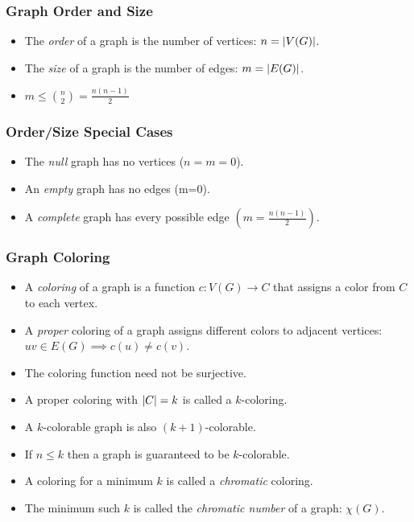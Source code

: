 \documentclass{beamer}
\newcommand{\X}{\chi}
\DeclarePairedDelimiter{\abs}{\lvert}{\rvert}
\begin{document}
\begin{frame}
  \frametitle{Graph Order and Size}
  \begin{itemize}
  \item The \emph{order} of a graph is the number of vertices: \(n=\abs{V(G)}\).
  \item The \emph{size} of a graph is the number of edges: \(m=\abs{E(G)}\).
  \item \(\displaystyle m\le\binom{n}{2}=\frac{n(n-1)}{2}\)
  \end{itemize}
\end{frame}

\begin{frame}
  \frametitle{Order/Size Special Cases}
  \begin{itemize}
  \item The \emph{null} graph has no vertices (\(n=m=0\)).
  \item An \emph{empty} graph has no edges (m=0).
  \item A \emph{complete} graph has every possible edge \(\displaystyle\left(m=\frac{n(n-1)}{2}\right)\).
  \end{itemize}
\end{frame}

\begin{frame}
  \frametitle{Graph Coloring}
  \begin{itemize}
  \item A \emph{coloring} of a graph is a function \(c:V(G)\to C\) that assigns a color from \(C\) to each vertex.
  \item A \emph{proper} coloring of a graph assigns different colors to adjacent vertices:
    \(uv\in E(G)\implies c(u)\ne c(v)\).
  \item The coloring function need not be surjective.
  \item A proper coloring with \(\abs{C}=k\) is called a \(k\)-coloring.
  \item A \(k\)-colorable graph is also \((k+1)\)-colorable.
  \item If \(n\le k\) then a graph is guaranteed to be \(k\)-colorable.
  \item A coloring for a minimum \(k\) is called a \emph{chromatic} coloring.
  \item The minimum such \(k\) is called the \emph{chromatic number} of a graph: \(\X(G)\).
  \end{itemize}
\end{frame}
\end{document}
